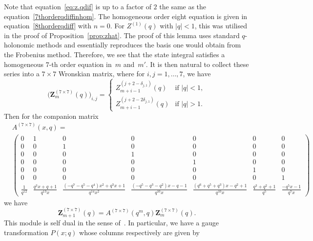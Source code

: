 \documentclass[pdftex]{sigma}
\numberwithin{equation}{section}
\begin{document}
Note that equation~\eqref{eq:z.qdif} is up to a factor of $2$ the same as the equation~\eqref{7thorderqdiffinhom}. The homogeneous order eight equation is given in equation~\eqref{8thorderqdiff} with $n=0$. For $Z^{(1)}(q)$ with $|q|<1$, this was utilised in the proof of Proposition~\ref{prop:zhat}.
The proof of this lemma uses standard $q$-holonomic methods and essentially reproduces the basis one would obtain from the Frobenius method.
Therefore, we see that the state integral satisfies a homogeneous $7$-th order equation in~$m$ and~$m'$. It is then natural to collect these series into a $7\times7$ Wronskian matrix, where for $i,j=1,\dots,7$, we have
\[
 \bigl(\mathbf{Z}_m^{(7\times 7)}(q)\bigr)_{i,j}=\begin{cases} Z_{m+i-1}^{(j+2-\delta_{j,1})}(q) & \text{if }|q|<1, \\
 Z_{m+i-1}^{(j+2-2\delta_{j,1})}(q) & \text{if }|q|>1.\end{cases}
\]
Then for the companion matrix{\setlength{\arraycolsep}{2.5pt}
\begin{align*}
 &A^{(7\times 7)}(x,q)=\\
 &
 \begin{pmatrix}
 0 & 1 & 0 & 0 & 0 & 0 & 0\\
 0 & 0 & 1 & 0 & 0 & 0 & 0\\
 0 & 0 & 0 & 1 & 0 & 0 & 0\\
 0 & 0 & 0 & 0 & 1 & 0 & 0\\
 0 & 0 & 0 & 0 & 0 & 1 & 0\\
 0 & 0 & 0 & 0 & 0 & 0 & 1\\
 \frac{1}{q^{12}} & \frac{q^3x + q + 1}{q^{13}x} & \frac{(-q^7 - q^5 - q^4)x^2 + q^3x + 1}{q^{14}x^2} & \frac{(-q^5 - q^3 - q^2)x - q - 1}{q^{10}x} & \frac{(q^6 + q^5 + q^3)x - q^2 + 1}{q^{10}x} & \frac{q^3 + q^2 + 1}{q^5} & \frac{-q^5x - 1}{q^7x}
 \end{pmatrix}
\end{align*}}%
we have
\[
 \mathbf{Z}_{m+1}^{(7\times 7)}(q)=A^{(7\times 7)}(q^m,q)\mathbf{Z}_m^{(7\times 7)}(q) .
\]
This module is self dual in the sense of~\cite{GW:qmod}. In particular, we have a gauge transformation
$P(x;q)$ whose columns respectively are given by
\end{document}
